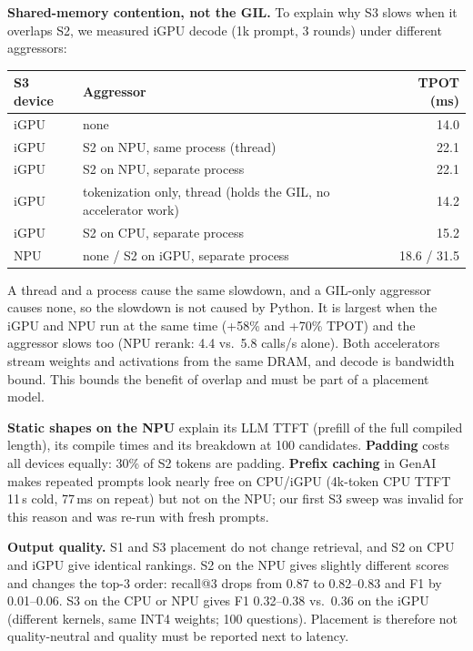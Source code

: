 \documentclass[10pt]{article}
\begin{document}
\textbf{Shared-memory contention, not the GIL.} To explain why S3 slows when it overlaps S2, we measured iGPU
decode (1k prompt, 3 rounds) under different aggressors:
\begin{center}\small
\begin{tabular}{llr}
\toprule
S3 device & Aggressor & TPOT (ms) \\
\midrule
iGPU & none & 14.0 \\
iGPU & S2 on NPU, same process (thread) & 22.1 \\
iGPU & S2 on NPU, separate process & 22.1 \\
iGPU & tokenization only, thread (holds the GIL, no accelerator work) & 14.2 \\
iGPU & S2 on CPU, separate process & 15.2 \\
NPU & none / S2 on iGPU, separate process & 18.6 / 31.5 \\
\bottomrule
\end{tabular}
\end{center}
A thread and a process cause the same slowdown, and a GIL-only aggressor causes none, so the slowdown is not caused
by Python. It is largest when the iGPU and NPU run at the same time (+58\% and +70\% TPOT) and the aggressor slows
too (NPU rerank: 4.4 vs.\ 5.8 calls/s alone). Both accelerators stream weights and activations from the same DRAM,
and decode is bandwidth bound. This bounds the benefit of overlap and must be part of a placement model.

\textbf{Static shapes on the NPU} explain its LLM TTFT (prefill of the full compiled length), its compile times and
its breakdown at 100 candidates. \textbf{Padding} costs all devices equally: 30\% of S2 tokens are padding.
\textbf{Prefix caching} in GenAI makes repeated prompts look nearly free on CPU/iGPU (4k-token CPU TTFT 11\,s cold,
77\,ms on repeat) but not on the NPU; our first S3 sweep was invalid for this reason and was re-run with fresh prompts.

\label{sec:quality}
\textbf{Output quality.} S1 and S3 placement do not change retrieval, and S2 on CPU and iGPU give identical
rankings. S2 on the NPU gives slightly different scores and changes the top-3 order: recall@3 drops from 0.87 to
0.82--0.83 and F1 by 0.01--0.06. S3 on the CPU or NPU gives F1 0.32--0.38 vs.\ 0.36 on the iGPU (different
kernels, same INT4 weights; 100 questions). Placement is therefore not quality-neutral and quality must be reported
next to latency.
\end{document}
